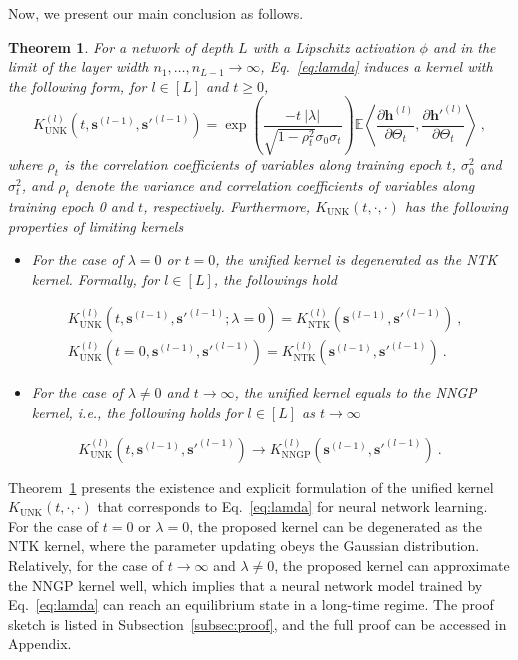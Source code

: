 \documentclass[review,10pt]{JMtemplate}
\newtheorem{theorem}{Theorem}
\begin{document}
Now, we present our main conclusion as follows.
\begin{theorem}  \label{thm:unified}
For a network of depth $L$ with a Lipschitz activation $\phi$ and in the limit of the layer width $n_1, \dots, n_{L-1} \to \infty$, Eq.~\eqref{eq:lamda} induces a kernel with the following form, for $l\in[L]$ and $t\geq 0$,
\begin{equation}  \label{eq:our_kernel_1}
K_{\textrm{UNK}}^{(l)} \left( t, \boldsymbol{s}^{(l-1)}, \boldsymbol{s}'^{(l-1)} \right)  = \exp\left( \frac{ -t ~|\lambda|}{\sqrt{1-\rho_{t}^2} \sigma_0 \sigma_t} \right) \mathbb{E} \left\langle \frac{\partial \boldsymbol{h}^{(l)}}{\partial \Theta_t} , \frac{\partial \boldsymbol{h}'^{(l)}}{\partial \Theta_t}  \right\rangle \ ,
\end{equation}
where $\rho_t$ is the correlation coefficients of variables along training epoch $t$, $\sigma_0^2$ and $\sigma_t^2$, and $\rho_t$ denote the variance and correlation coefficients of variables along training epoch 0 and $t$, respectively.  Furthermore, $K_{\textrm{UNK}}(t,\cdot,\cdot)$ has the following properties of limiting kernels
\begin{itemize}
    \item[(i)] For the case of $\lambda = 0$ or $t=0$, the unified kernel is degenerated as the NTK kernel. Formally, for $l \in [L]$, the followings hold
\end{itemize}
\[
\begin{aligned}
&K_{\textrm{UNK}}^{(l)} \left( t, \boldsymbol{s}^{(l-1)}, \boldsymbol{s}'^{(l-1)} ;\lambda=0 \right) = K_{\textrm{NTK}}^{(l)} \left(  \boldsymbol{s}^{(l-1)}, \boldsymbol{s}'^{(l-1)} \right) \ , \\
&K_{\textrm{UNK}}^{(l)} \left( t=0, \boldsymbol{s}^{(l-1)}, \boldsymbol{s}'^{(l-1)} \right) = K_{\textrm{NTK}}^{(l)} \left(  \boldsymbol{s}^{(l-1)}, \boldsymbol{s}'^{(l-1)} \right) \ .
\end{aligned}
\]
\begin{itemize}
    \item[(ii)] For the case of $\lambda \neq 0$ and $t \to \infty$, the unified kernel equals to the NNGP kernel, i.e., the following holds for $l\in[L]$ as $t \to \infty$
\end{itemize}
\[
K_{\textrm{UNK}}^{(l)} \left( t, \boldsymbol{s}^{(l-1)}, \boldsymbol{s}'^{(l-1)} \right) \to K_{\textrm{NNGP}}^{(l)} \left(  \boldsymbol{s}^{(l-1)}, \boldsymbol{s}'^{(l-1)} \right) \ .
\]
\end{theorem}
Theorem~\ref{thm:unified} presents the existence and explicit formulation of the unified kernel $K_{\textrm{UNK}}(t,\cdot,\cdot)$ that corresponds to Eq.~\eqref{eq:lamda} for neural network learning. For the case of $t=0$ or $\lambda =0$, the proposed kernel can be degenerated as the NTK kernel, where the parameter updating obeys the Gaussian distribution. Relatively, for the case of $t \to \infty$ and $\lambda \neq 0$, the proposed kernel can approximate the NNGP kernel well, which implies that a neural network model trained by Eq.~\eqref{eq:lamda} can reach an equilibrium state in a long-time regime. The proof sketch is listed in Subsection~\ref{subsec:proof}, and the full proof can be accessed in Appendix.
\end{document}
